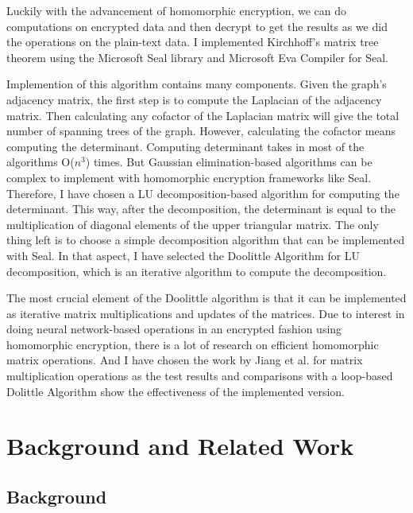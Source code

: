 \documentclass{winslabreport}
\begin{document}
Luckily with the advancement of homomorphic encryption, we can do computations on encrypted data and then decrypt to get the results as we did the operations on the plain-text data. I implemented Kirchhoff's matrix tree theorem using the Microsoft Seal library and Microsoft Eva Compiler for Seal. 

Implemention of this algorithm contains many components. Given the graph's adjacency matrix, the first step is to compute the Laplacian of the adjacency matrix. Then calculating any cofactor of the Laplacian matrix will give the total number of spanning trees of the graph. However, calculating the cofactor means computing the determinant. Computing determinant takes in most of the algorithms O($n^3$) times. But Gaussian elimination-based algorithms can be complex to implement with homomorphic encryption frameworks like Seal. Therefore, I have chosen a LU decomposition-based algorithm for computing the determinant. This way, after the decomposition, the determinant is equal to the multiplication of diagonal elements of the upper triangular matrix. The only thing left is to choose a simple decomposition algorithm that can be implemented with Seal. In that aspect, I have selected the Doolittle Algorithm for LU decomposition, which is an iterative algorithm to compute the decomposition. 

The most crucial element of the Doolittle algorithm is that it can be implemented as iterative matrix multiplications and updates of the matrices. Due to interest in doing neural network-based operations in an encrypted fashion using homomorphic encryption, there is a lot of research on efficient homomorphic matrix operations. \cite{10.1145/3243734.3243837, https://doi.org/10.48550/arxiv.2201.12577, Mishra2018FastSM} And I have chosen the work by Jiang et al. \cite{10.1145/3243734.3243837} for matrix multiplication operations as the test results and comparisons with a loop-based Dolittle Algorithm show the effectiveness of the implemented version.


\section{Background and Related Work}

\subsection{Background}

\end{document}
